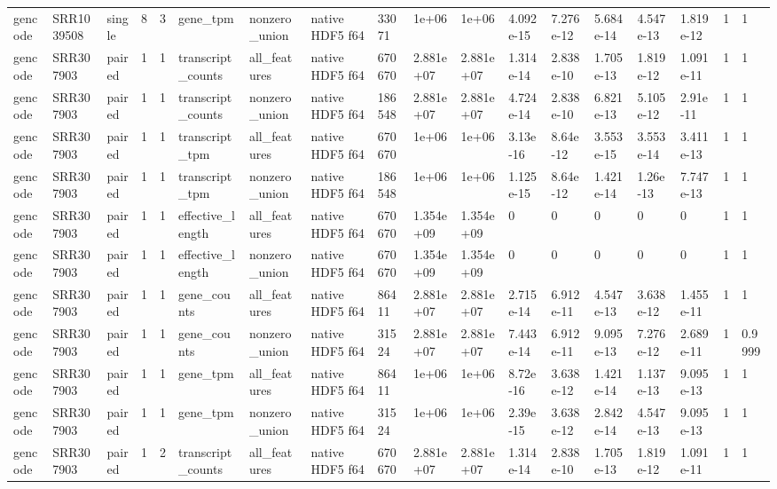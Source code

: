 \begin{tabular}{llllllllllllllllll}
gencode & SRR1039508 & single & 8 & 3 & gene\_tpm & nonzero\_union & native HDF5 f64 & 33071 & 1e+06 & 1e+06 & 4.092e-15 & 7.276e-12 & 5.684e-14 & 4.547e-13 & 1.819e-12 & 1 & 1 \\
gencode & SRR307903 & paired & 1 & 1 & transcript\_counts & all\_features & native HDF5 f64 & 670670 & 2.881e+07 & 2.881e+07 & 1.314e-14 & 2.838e-10 & 1.705e-13 & 1.819e-12 & 1.091e-11 & 1 & 1 \\
gencode & SRR307903 & paired & 1 & 1 & transcript\_counts & nonzero\_union & native HDF5 f64 & 186548 & 2.881e+07 & 2.881e+07 & 4.724e-14 & 2.838e-10 & 6.821e-13 & 5.105e-12 & 2.91e-11 & 1 & 1 \\
gencode & SRR307903 & paired & 1 & 1 & transcript\_tpm & all\_features & native HDF5 f64 & 670670 & 1e+06 & 1e+06 & 3.13e-16 & 8.64e-12 & 3.553e-15 & 3.553e-14 & 3.411e-13 & 1 & 1 \\
gencode & SRR307903 & paired & 1 & 1 & transcript\_tpm & nonzero\_union & native HDF5 f64 & 186548 & 1e+06 & 1e+06 & 1.125e-15 & 8.64e-12 & 1.421e-14 & 1.26e-13 & 7.747e-13 & 1 & 1 \\
gencode & SRR307903 & paired & 1 & 1 & effective\_length & all\_features & native HDF5 f64 & 670670 & 1.354e+09 & 1.354e+09 & 0 & 0 & 0 & 0 & 0 & 1 & 1 \\
gencode & SRR307903 & paired & 1 & 1 & effective\_length & nonzero\_union & native HDF5 f64 & 670670 & 1.354e+09 & 1.354e+09 & 0 & 0 & 0 & 0 & 0 & 1 & 1 \\
gencode & SRR307903 & paired & 1 & 1 & gene\_counts & all\_features & native HDF5 f64 & 86411 & 2.881e+07 & 2.881e+07 & 2.715e-14 & 6.912e-11 & 4.547e-13 & 3.638e-12 & 1.455e-11 & 1 & 1 \\
gencode & SRR307903 & paired & 1 & 1 & gene\_counts & nonzero\_union & native HDF5 f64 & 31524 & 2.881e+07 & 2.881e+07 & 7.443e-14 & 6.912e-11 & 9.095e-13 & 7.276e-12 & 2.689e-11 & 1 & 0.9999 \\
gencode & SRR307903 & paired & 1 & 1 & gene\_tpm & all\_features & native HDF5 f64 & 86411 & 1e+06 & 1e+06 & 8.72e-16 & 3.638e-12 & 1.421e-14 & 1.137e-13 & 9.095e-13 & 1 & 1 \\
gencode & SRR307903 & paired & 1 & 1 & gene\_tpm & nonzero\_union & native HDF5 f64 & 31524 & 1e+06 & 1e+06 & 2.39e-15 & 3.638e-12 & 2.842e-14 & 4.547e-13 & 9.095e-13 & 1 & 1 \\
gencode & SRR307903 & paired & 1 & 2 & transcript\_counts & all\_features & native HDF5 f64 & 670670 & 2.881e+07 & 2.881e+07 & 1.314e-14 & 2.838e-10 & 1.705e-13 & 1.819e-12 & 1.091e-11 & 1 & 1 \\

\end{tabular}
